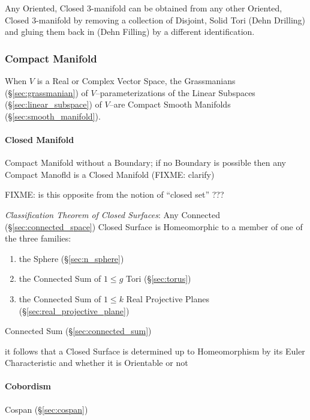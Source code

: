 Any Oriented, Closed 3-manifold can be obtained from any other
Oriented, Closed 3-manifold by removing a collection of Disjoint,
Solid Tori (Dehn Drilling) and gluing them back in (Dehn Filling) by a
different identification.



\subsubsection{Compact Manifold}\label{sec:compact_manifold}

When $V$ is a Real or Complex Vector Space, the Grassmanians
(\S\ref{sec:grassmanian}) of $V$--parameterizations of the Linear Subspaces
(\S\ref{sec:linear_subspace}) of $V$--are Compact Smooth Manifolds
(\S\ref{sec:smooth_manifold}).



\paragraph{Closed Manifold}\label{sec:closed_manifold}\hfill

Compact Manifold without a Boundary; if no Boundary is possible then any
Compact Manofld is a Closed Manifold (FIXME: clarify)

FIXME: is this opposite from the notion of ``closed set'' ???

\emph{Classification Theorem of Closed Surfaces}: Any Connected
(\S\ref{sec:connected_space}) Closed Surface is Homeomorphic to a member of one
of the three families:
\begin{enumerate}
  \item the Sphere (\S\ref{sec:n_sphere})
  \item the Connected Sum of $1 \leq g$ Tori (\S\ref{sec:torus})
  \item the Connected Sum of $1 \leq k$ Real Projective Planes
    (\S\ref{sec:real_projective_plane})
\end{enumerate}
\fist Connected Sum (\S\ref{sec:connected_sum})

it follows that a Closed Surface is determined up to Homeomorphism by its Euler
Characteristic and whether it is Orientable or not



\paragraph{Cobordism}\label{sec:cobordism}\hfill

Cospan (\S\ref{sec:cospan})

